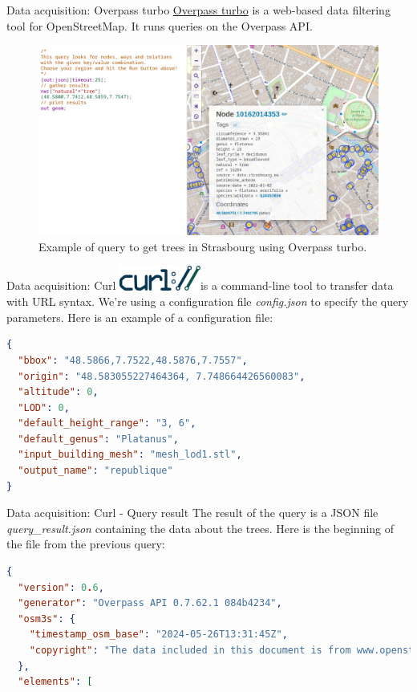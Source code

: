 \documentclass[10pt]{beamer}
\begin{document}
\begin{frame}{Data acquisition: Overpass turbo}
\href{https://overpass-turbo.eu/}{Overpass turbo}
 is a web-based data filtering tool for OpenStreetMap. 
It runs queries on the Overpass API.

  \begin{figure}[H]
    \centering
    \includegraphics[width=1\textwidth]{images/overpass_turbo.png}
    \caption{Example of query to get trees in Strasbourg using Overpass turbo.}
  \end{figure}
\end{frame}

\begin{frame}[fragile]{Data acquisition: Curl}
  \includegraphics[width=0.2\textwidth]{images/Curl-logo.svg.png}is a command-line tool to transfer data with URL syntax.
  We're using a configuration file \textit{config.json} to specify the query parameters.
  Here is an example of a configuration file:
\begin{lstlisting}[language=json]
{
  "bbox": "48.5866,7.7522,48.5876,7.7557",
  "origin": "48.583055227464364, 7.748664426560083",
  "altitude": 0,
  "LOD": 0,
  "default_height_range": "3, 6",
  "default_genus": "Platanus",
  "input_building_mesh": "mesh_lod1.stl",
  "output_name": "republique"
}
\end{lstlisting}
\end{frame}

\begin{frame}[fragile]{Data acquisition: Curl - Query result} 
  The result of the query is a JSON file \textit{query\_result.json} containing the data about the trees.
Here is the beginning of the file from the previous query:

\begin{lstlisting}[language=json]
{
  "version": 0.6,
  "generator": "Overpass API 0.7.62.1 084b4234",
  "osm3s": {
    "timestamp_osm_base": "2024-05-26T13:31:45Z",
    "copyright": "The data included in this document is from www.openstreetmap.org. The data is made available under ODbL."
  },
  "elements": [
\end{lstlisting}
\end{frame}
\end{document}
